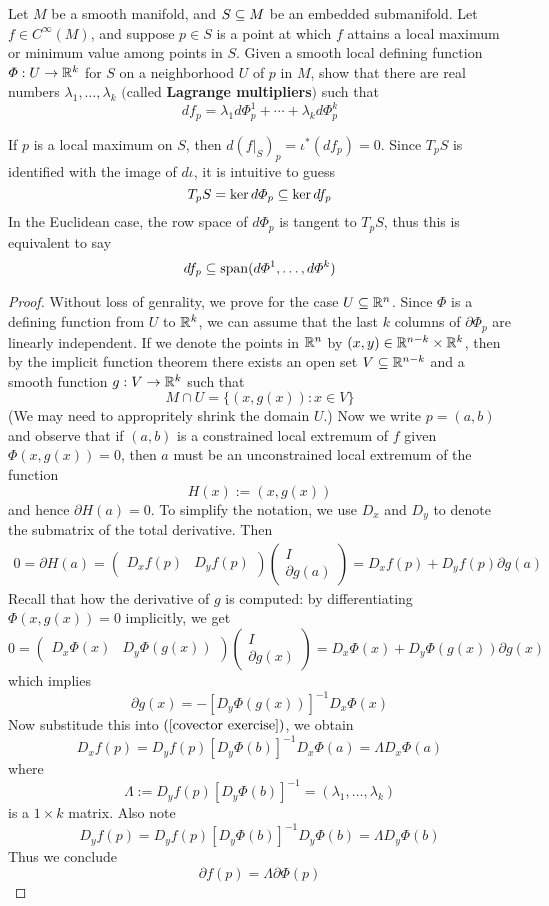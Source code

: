 \begin{exercise}
Let $M$ be a smooth manifold, and $S\subseteq M$ be an embedded submanifold. Let $f\in C^\infty(M)$, and suppose $p\in S$ is a point at which $f$ attains a local maximum or minimum value among points in $S$. Given a smooth local defining function $\varPhi:U\to\mathbb{R}^k$ for $S$ on a neighborhood $U$ of $p$ in $M$, show that there are real numbers $\lambda_1,\dots,\lambda_k$ $($called \textbf{Lagrange multipliers}$)$ such that
\[df_p=\lambda_1d\varPhi^1_p+\cdots+\lambda_kd\varPhi^k_p\]
\end{exercise}
\begin{remark}
If $p$ is a local maximum on $S$, then $d(f|_S)_p=\iota^*(df_p)=0$. Since $T_pS$ is identified with the image of $d\iota$, it is intuitive to guess 
\[T_pS=\ker d\varPhi_p\subseteq\ker df_p\]
In the Euclidean case, the row space of $d\varPhi_p$ is tangent to $T_pS$, thus this is equivalent to say 
\[df_p\subseteq\mathrm{span}(d\varPhi^1,\dots,d\varPhi^k)\]
\end{remark}
\begin{proof}
Without loss of genrality, we prove for the case $U\subseteq\mathbb{R}^n$. Since $\varPhi$ is a defining function from $U$ to $\mathbb{R}^k$, we can assume that the last $k$ columns of $\partial\varPhi_p$ are linearly independent. If we denote the points in $\mathbb{R}^n$ by $(x,y)\in\mathbb{R}^{n-k}\times\mathbb{R}^k$, then by the implicit function theorem there exists an open set $V\subseteq\mathbb{R}^{n-k}$ and a smooth function $g:V\to\mathbb{R}^k$ such that
\[M\cap U=\{(x,g(x)):x\in V\}\]
(We may need to appropritely shrink the domain $U$.) Now we write $p=(a,b)$ and observe that if $(a,b)$ is a constrained local extremum of $f$ given $\varPhi(x,g(x))=0$, then $a$ must be an unconstrained local extremum of the function
\[H(x):=(x,g(x))\]
and hence $\partial H(a)=0$. To simplify the notation, we use $D_x$ and $D_y$ to denote the submatrix of the total derivative. Then
\begin{align}\label{covector exercise}
0=\partial H(a)=\begin{pmatrix}
D_xf(p)&D_yf(p)
\end{pmatrix}\begin{pmatrix}
I\\
\partial g(a)
\end{pmatrix}=D_xf(p)+D_yf(p)\partial g(a)
\end{align}
Recall that how the derivative of $g$ is computed:  by differentiating $\varPhi(x,g(x))=0$ implicitly, we get
\[0=\begin{pmatrix}
D_x\varPhi(x)&D_y\varPhi(g(x))
\end{pmatrix}\begin{pmatrix}
I\\
\partial g(x)
\end{pmatrix}=D_x\varPhi(x)+D_y\varPhi(g(x))\partial g(x)\]
which implies
\[\partial g(x)=-[D_y\varPhi(g(x))]^{-1}D_x\varPhi(x)\]
Now substitude this into $(\ref{covector exercise})$, we obtain
\[D_xf(p)=D_yf(p)[D_y\varPhi(b)]^{-1}D_x\varPhi(a)=\Lambda D_x\varPhi(a)\]
where
\[\Lambda:=D_yf(p)[D_y\varPhi(b)]^{-1}=(\lambda_1,\dots,\lambda_k)\]
is a $1\times k$ matrix. Also note
\[D_yf(p)=D_yf(p)[D_y\varPhi(b)]^{-1}D_y\varPhi(b)=\Lambda D_y\varPhi(b)\]
Thus we conclude
\[\partial f(p)=\Lambda\partial\varPhi(p)\]
\end{proof}
